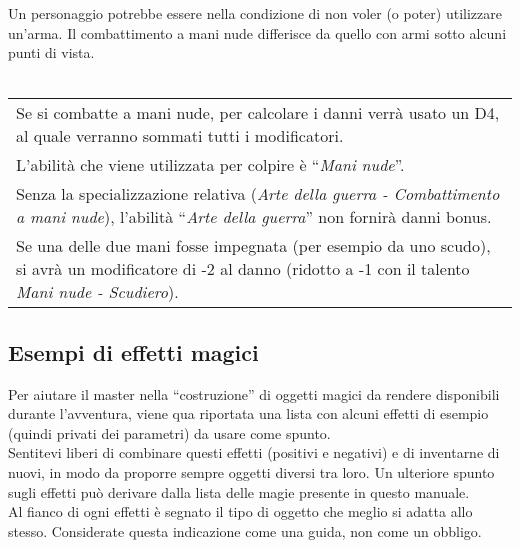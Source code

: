 \documentclass[../manuale_main.tex]{subfiles}
\begin{document}
Un personaggio potrebbe essere nella condizione di non voler (o poter) utilizzare un'arma. Il combattimento a mani nude differisce da quello con armi sotto alcuni punti di vista.\\\mbox{}\\
\renewcommand{\arraystretch}{1.5}
\begin{tabularx}{\linewidth}{|X|}
\hline
Se si combatte a mani nude, per calcolare i danni verrà usato un D4, al quale verranno sommati tutti i modificatori.\\
L'abilità che viene utilizzata per colpire è “\emph{Mani nude}”.\\
Senza la specializzazione relativa (\emph{Arte della guerra - Combattimento a mani nude}), l'abilità “\emph{Arte della guerra}” non fornirà danni bonus.\\
Se una delle due mani fosse impegnata (per esempio da uno scudo), si avrà un modificatore di -2 al danno (ridotto a -1 con il talento \emph{Mani nude - Scudiero}).\\
\hline
\end{tabularx}


\subsection{Esempi di effetti magici}

Per aiutare il master nella “costruzione” di oggetti magici da rendere disponibili durante l’avventura, viene qua riportata una lista con alcuni effetti di esempio (quindi privati dei parametri) da usare come spunto.\\
Sentitevi liberi di combinare questi effetti (positivi e negativi) e di inventarne di nuovi, in modo da proporre sempre oggetti diversi tra loro. Un ulteriore spunto sugli effetti può derivare dalla lista delle magie presente in questo manuale.\\
Al fianco di ogni effetti è segnato il tipo di oggetto che meglio si adatta allo stesso. Considerate questa indicazione come una guida, non come un obbligo.
\end{document}
